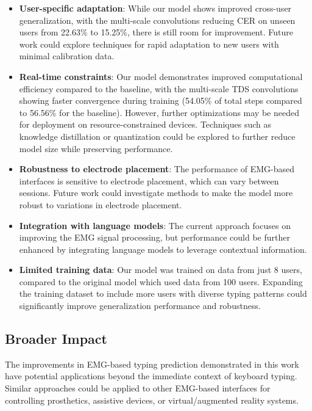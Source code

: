 \begin{itemize}
    \item \textbf{User-specific adaptation}: While our model shows improved cross-user generalization, with the multi-scale convolutions reducing CER on unseen users from 22.63\% to 15.25\%, there is still room for improvement. Future work could explore techniques for rapid adaptation to new users with minimal calibration data.

    \item \textbf{Real-time constraints}: Our model demonstrates improved computational efficiency compared to the baseline, with the multi-scale TDS convolutions showing faster convergence during training (54.05\% of total steps compared to 56.56\% for the baseline). However, further optimizations may be needed for deployment on resource-constrained devices. Techniques such as knowledge distillation or quantization could be explored to further reduce model size while preserving performance.

    \item \textbf{Robustness to electrode placement}: The performance of EMG-based interfaces is sensitive to electrode placement, which can vary between sessions. Future work could investigate methods to make the model more robust to variations in electrode placement.

    \item \textbf{Integration with language models}: The current approach focuses on improving the EMG signal processing, but performance could be further enhanced by integrating language models to leverage contextual information.
    \item \textbf{Limited training data}: Our model was trained on data from just 8 users, compared to the original model which used data from 100 users. Expanding the training dataset to include more users with diverse typing patterns could significantly improve generalization performance and robustness.
\end{itemize}

\subsection{Broader Impact}\label{subsec:broader}

The improvements in EMG-based typing prediction demonstrated in this work have potential applications beyond the immediate context of keyboard typing. Similar approaches could be applied to other EMG-based interfaces for controlling prosthetics, assistive devices, or virtual/augmented reality systems.

